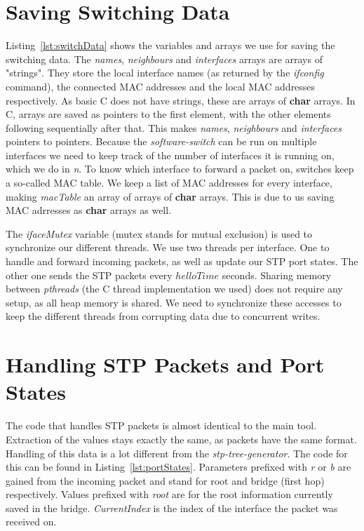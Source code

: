 \section{Saving Switching Data}

Listing~\ref{lst:switchData} shows the variables and arrays we use for saving the switching data.
The \textit{names}, \textit{neighbours} and \textit{interfaces} arrays are arrays of "strings".
They store the local interface names (as returned by the \textit{ifconfig} command), the connected MAC addresses and the local MAC addresses respectively.
As basic C does not have strings, these are arrays of \textbf{char} arrays.
In C, arrays are saved as pointers to the first element, with the other elements following sequentially after that.
This makes \textit{names}, \textit{neighbours} and \textit{interfaces} pointers to pointers.
Because the \textit{software-switch} can be run on multiple interfaces we need to keep track of the number of interfaces it is running on, which we do in \textit{n}.
To know which interface to forward a packet on, switches keep a so-called MAC table.
We keep a list of MAC addresses for every interface, making \textit{macTable} an array of arrays of \textbf{char} arrays.
This is due to us saving MAC adrresses as \textbf{char} arrays as well.

The \textit{ifaceMutex} variable (mutex stands for mutual exclusion) is used to synchronize our different threads.
We use two threads per interface.
One to handle and forward incoming packets, as well as update our STP port states.
The other one sends the STP packets every $helloTime$ seconds.
Sharing memory between \textit{pthreads} (the C thread implementation we used) does not require any setup, as all heap memory is shared\cite{pthreads}.
We need to synchronize these accesses to keep the different threads from corrupting data due to concurrent writes.

\section{Handling STP Packets and Port States}
The code that handles STP packets is almost identical to the main tool.
Extraction of the values stays exactly the same, as packets have the same format.
Handling of this data is a lot different from the \textit{stp-tree-generator}.
The code for this can be found in Listing~\ref{lst:portStates}.
Parameters prefixed with \textit{r} or \textit{b} are gained from the incoming packet and stand for root and bridge (first hop) respectively.
Values prefixed with \textit{root} are for the root information currently saved in the bridge.
\textit{CurrentIndex} is the index of the interface the packet was received on.


